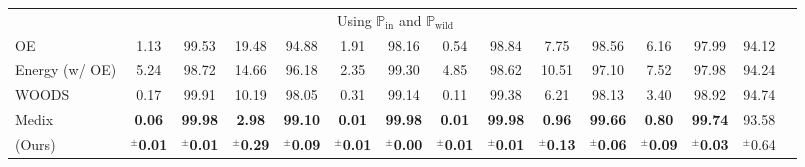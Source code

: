 \documentclass[10pt]{article} %
\theoremstyle{plain}
\theoremstyle{definition}
\begin{document}
\begin{table}[h]
{\begin{tabular}{lcccccccccccccc}
\hline
\multicolumn{14}{c}{Using $\mathbb{P}_{\text{in}}$ and $\mathbb{P}_{\text{wild}}$ } \\
OE& 1.13 &  99.53 & 19.48 &  94.88 & 1.91 &  98.16 & 0.54 &  98.84 & 7.75 &  98.56 & 6.16 & 97.99 &  94.12\\
Energy (w/ OE) & 5.24 &  98.72  & 14.66 &  96.18 & 2.35 & 99.30 & 4.85 &  98.62 & 10.51 & 97.10 & 7.52 & 97.98 &  94.24 \\
WOODS& 0.17 & 99.91 &  10.19 & 98.05 & 0.31 & {99.14} & {0.11} &  {99.38} &  6.21 &  98.13 & 3.40 &  98.92 & 94.74 \\

\rowcolor[HTML]{DCEEFF} Medix   & \textbf{0.06} & \textbf{99.98} & \textbf{2.98} & \textbf{99.10} & \textbf{0.01} & \textbf{99.98} & \textbf{0.01}  & \textbf{99.98} & \textbf{0.96} & \textbf{99.66} & \textbf{0.80}  & \textbf{99.74} & 93.58 \\

\rowcolor[HTML]{DCEEFF} (Ours) & $^{\pm}$\textbf{0.01} & $^{\pm}$\textbf{0.01} & $^{\pm}$\textbf{0.29} & $^{\pm}$\textbf{0.09} & $^{\pm}$\textbf{0.01} & $^{\pm}$\textbf{0.00} & $^{\pm}$\textbf{0.01} & $^{\pm}$\textbf{0.01} & $^{\pm}$\textbf{0.13} & $^{\pm}$\textbf{0.06} & $^{\pm}$\textbf{0.09} & $^{\pm}$\textbf{0.03} & $^{\pm}${0.64} \\
\hline
\end{tabular}
}
\label{tab:cifar10}
\end{table}
\end{document}
